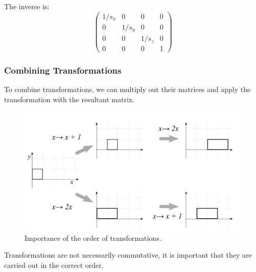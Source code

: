 \documentclass[11pt]{article}
\begin{document}
The inverse is:
\[
  \begin{pmatrix}
    1/s_x & 0 & 0 & 0 \\
    0 & 1/s_y & 0 & 0 \\
    0 & 0 & 1/s_z & 0 \\
    0 & 0 & 0 & 1
  \end{pmatrix}
\]


\subsubsection{Combining Transformations}
To combine transformations, we can multiply out their matrices and apply the transformation with the resultant matrix.

\begin{figure}[h]
  \caption{Importance of the order of transformations.}
  \includegraphics[scale=0.2]{combining}
  \centering
\end{figure}

Transformations are not necessarily commutative, it is important that they are carried out in the correct order.
\end{document}
